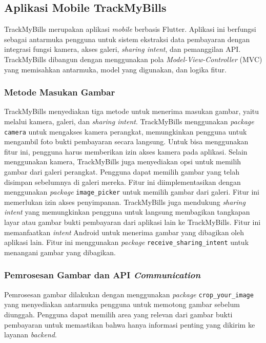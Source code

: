 \subsection{Aplikasi Mobile TrackMyBills}
\label{subsec:aplikasi-mobile-trackmybills}

TrackMyBills merupakan aplikasi \emph{mobile} berbasis Flutter. Aplikasi ini berfungsi sebagai antarmuka pengguna untuk sistem ekstraksi data pembayaran dengan integrasi fungsi kamera, akses galeri, \emph{sharing intent}, dan pemanggilan API. TrackMyBills dibangun dengan menggunakan pola \emph{Model-View-Controller} (MVC) yang memisahkan antarmuka, model yang digunakan, dan logika fitur.

\subsubsection{Metode Masukan Gambar}
\label{subsubsec:metode-masukan-gambar}

TrackMyBills menyediakan tiga metode untuk menerima masukan gambar, yaitu melalui kamera, galeri, dan \emph{sharing intent}. TrackMyBills menggunakan \emph{package} \texttt{camera} untuk mengakses kamera perangkat, memungkinkan pengguna untuk mengambil foto bukti pembayaran secara langsung. Untuk bisa menggunakan fitur ini, pengguna harus memberikan izin akses kamera pada aplikasi. Selain menggunakan kamera, TrackMyBills juga menyediakan opsi untuk memilih gambar dari galeri perangkat. Pengguna dapat memilih gambar yang telah disimpan sebelumnya di galeri mereka. Fitur ini diimplementasikan dengan menggunakan \emph{package} \texttt{image\_picker} untuk memilih gambar dari galeri. Fitur ini memerlukan izin akses penyimpanan. TrackMyBills juga mendukung \emph{sharing intent} yang memungkinkan pengguna untuk langsung membagikan tangkapan layar atau gambar bukti pembayaran dari aplikasi lain ke TrackMyBills. Fitur ini memanfaatkan \emph{intent} Android untuk menerima gambar yang dibagikan oleh aplikasi lain. Fitur ini menggunakan \emph{package} \texttt{receive\_sharing\_intent} untuk menangani gambar yang dibagikan.

\subsubsection{Pemrosesan Gambar dan API \emph{Communication}}
\label{subsubsec:pemrosesan-gambar}

Pemrosesan gambar dilakukan dengan menggunakan \emph{package} \texttt{crop\_your\_image} yang menyediakan antarmuka pengguna untuk memotong gambar sebelum diunggah. Pengguna dapat memilih area yang relevan dari gambar bukti pembayaran untuk memastikan bahwa hanya informasi penting yang dikirim ke layanan \emph{backend}. 

